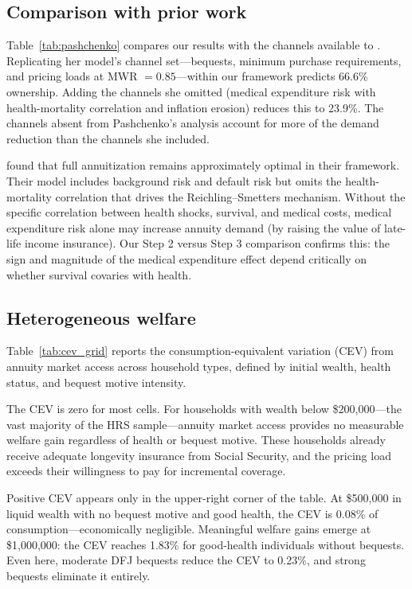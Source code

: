 \documentclass[12pt]{article}
\begin{document}
\subsection{Comparison with prior work}

Table~\ref{tab:pashchenko} compares our results with the channels available to \citet{pashchenko2013}. Replicating her model's channel set---bequests, minimum purchase requirements, and pricing loads at MWR $= 0.85$---within our framework predicts 66.6\% ownership. Adding the channels she omitted (medical expenditure risk with health-mortality correlation and inflation erosion) reduces this to 23.9\%. The channels absent from Pashchenko's analysis account for more of the demand reduction than the channels she included.



\citet{peijnenburg2016} found that full annuitization remains approximately optimal in their framework. Their model includes background risk and default risk but omits the health-mortality correlation that drives the Reichling--Smetters mechanism. Without the specific correlation between health shocks, survival, and medical costs, medical expenditure risk alone may increase annuity demand (by raising the value of late-life income insurance). Our Step 2 versus Step 3 comparison confirms this: the sign and magnitude of the medical expenditure effect depend critically on whether survival covaries with health.

\subsection{Heterogeneous welfare}

Table~\ref{tab:cev_grid} reports the consumption-equivalent variation (CEV) from annuity market access across household types, defined by initial wealth, health status, and bequest motive intensity.



The CEV is zero for most cells. For households with wealth below \$200,000---the vast majority of the HRS sample---annuity market access provides no measurable welfare gain regardless of health or bequest motive. These households already receive adequate longevity insurance from Social Security, and the pricing load exceeds their willingness to pay for incremental coverage.

Positive CEV appears only in the upper-right corner of the table. At \$500,000 in liquid wealth with no bequest motive and good health, the CEV is 0.08\% of consumption---economically negligible. Meaningful welfare gains emerge at \$1,000,000: the CEV reaches 1.83\% for good-health individuals without bequests. Even here, moderate DFJ bequests reduce the CEV to 0.23\%, and strong bequests eliminate it entirely.
\end{document}
